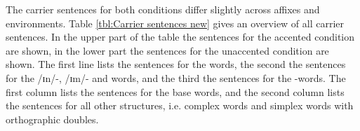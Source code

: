The carrier sentences for both conditions differ slightly across affixes and environments. Table \ref{tbl:Carrier sentences new} gives an overview of all carrier sentences. In the upper part of the table the sentences for the accented condition are shown, in the lower part the sentences for the unaccented condition are shown. 
The first line lists the sentences for the words, the second the sentences for the /ɪn/-, /ɪm/- and words, and the third the sentences for the -words.
The first column lists the sentences for the base words, and the second column lists the sentences for all other structures, i.e. complex words and simplex words with orthographic doubles. 




  \begin{table}[t!]
  	\caption{Carrier sentences}
  	\label{tbl:Carrier sentences new}
  	\begin{center}
\end{center}
\end{table}
